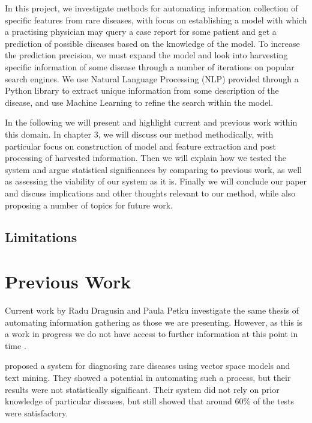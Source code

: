 \documentclass[10pt,letterpaper,final]{article}
\begin{document}
In this project, we investigate methods for automating information
collection of specific features from rare diseases, with focus on
establishing a model with which a practising physician may query a case
report for some patient and get a prediction of possible diseases based
on the knowledge of the model.
To increase the prediction precision, we must expand the model and look
into harvesting specific information of some disease through a number of
iterations on popular search engines. We use Natural Language Processing
(NLP) provided through a Python library \cite{NLTK} to extract unique
information from some description of the disease, and use Machine
Learning to refine the search within the model.


In the following we will present and highlight current and previous work
within this domain. In chapter 3, we will discuss our method
methodically, with particular focus on construction of model and feature
extraction and post processing of harvested information.
Then we will explain how we tested the system and argue statistical
significances by comparing to previous work, as well as assessing the
viability of our system as it is.
Finally we will conclude our paper and discuss implications and other
thoughts relevant to our method, while also proposing a number of topics
for future work.

\subsection{Limitations}

\section{Previous Work}
Current work by Radu Dragusin and Paula Petku investigate the same
thesis of automating information gathering as those we are presenting.
However, as this is a work in progress we do not have access to further
information at this point in time \cite{radupaula}.

\cite{jensenandersen} proposed a system for diagnosing rare diseases
using vector space models and text mining. They showed a potential in
automating such a process, but their results were not statistically
significant. Their system did not rely on prior knowledge of particular
diseases, but still showed that around 60\% of the tests were
satisfactory.
\end{document}
